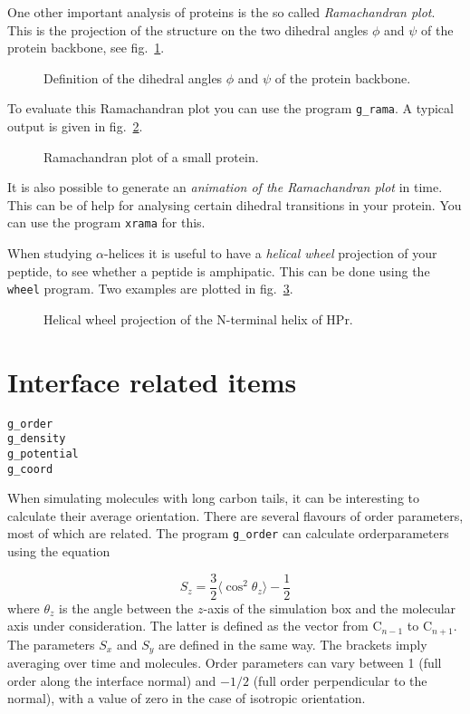 One other important analysis of proteins is the so called 
{\em Ramachandran plot}. 
This is the projection of the structure on the two dihedral angles $\phi$ and 
$\psi$ of the protein backbone, see fig.~\ref{fig:phipsi}.
%
\begin{figure}[hbtp]
\centerline{
}
\caption{Definition of the dihedral angles $\phi$ and $\psi$ of the protein backbone.}
\label{fig:phipsi}
\end{figure}
%
To evaluate this Ramachandran plot you can use the program {\tt g\_rama}. 
A typical output is given in fig.~\ref{fig:rama}.
%
\begin{figure}[hbtp]
\centerline{
{}}
\caption{Ramachandran plot of a small protein.}
\label{fig:rama}
\end{figure}
%

It is also possible to generate an {\em animation of the Ramachandran plot} 
in time. This can be of help for analysing certain dihedral transitions 
in your protein. You can use the program {\tt xrama} for this.

%
When studying $\alpha$-helices 
it is useful to have a {\em helical wheel} projection
of your peptide, to see whether a peptide is amphipatic. This can be done
using the {\tt wheel} program. Two examples are 
plotted in fig.~\ref{fig:wheel}.
%
\begin{figure}[hbtp]
\centerline{}
\caption{Helical wheel projection of the N-terminal helix of HPr.}
\label{fig:wheel}
\end{figure}


%
\section{Interface related items}
\begin{verbatim}
g_order
g_density
g_potential
g_coord
\end{verbatim}

When simulating molecules with long carbon tails, it can be
interesting to calculate their average orientation. There are several
flavours of order parameters, most of which are related. The program
{\tt g\_order} can calculate orderparameters using the equation

\begin{equation}
S_{z} = \frac{3}{2}\langle {\cos^2{\theta_z}} \rangle - \frac{1}{2}
\label{eq:Sgr}
\end{equation}
where $\theta_z$ is the angle between the $z$-axis of the simulation
box and the molecular axis under consideration. The latter is defined as the
vector from C$_{n-1}$ to C$_{n+1}$. The parameters $S_x$
and $S_y$ are defined in the same way. The brackets imply averaging over time
and molecules. Order parameters can vary between 1 (full order along
the interface normal) and $-1/2$ (full order perpendicular to the
normal), with a value of zero in the case of isotropic orientation.

